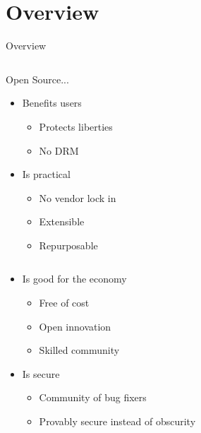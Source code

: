 \section{Overview}\frame{\sectionpage}

\begin{frame}{Overview}
  \begin{column}{.5\linewidth}
    Open Source...
    \begin{itemize}
      \item Benefits users
        \begin{itemize}
          \item Protects liberties
          \item No DRM
        \end{itemize}
      \item Is practical
        \begin{itemize}
          \item No vendor lock in
          \item Extensible
          \item Repurposable
        \end{itemize}
    \end{itemize}
  \end{column}
  \begin{column}{.5\linewidth}
    \begin{itemize}
      \item Is good for the economy
        \begin{itemize}
          \item Free of cost
          \item Open innovation
          \item Skilled community
        \end{itemize}
      \item Is secure
        \begin{itemize}
          \item Community of bug fixers
          \item Provably secure instead of obscurity
        \end{itemize}
    \end{itemize}
  \end{column}
\end{frame}
